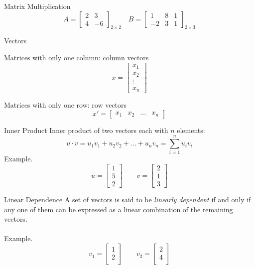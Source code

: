 \documentclass{./../../Latex/teaching_slides}
\begin{document}
\begin{frame}{Matrix Multiplication}
$$A = \begin{bmatrix}
2 & 3  \\
4 & -6 
\end{bmatrix}_{2 \times 2} \quad B = \begin{bmatrix}
1 & 8 & 1\\
-2 & 3 & 1
\end{bmatrix}_{2 \times 3}$$
\end{frame}


\begin{frame}{Vectors}
\begin{witemize}
\item Matrices with only one column: column vectors 
$$ x =  \begin{bmatrix}
x_1\\
x_2 \\
\vdots \\
x_n
\end{bmatrix} $$
\item Matrices with only one row: row vectors
$$ x' =  \begin{bmatrix}
x_1 &
x_2 & \hdots &
x_n
\end{bmatrix} $$
\end{witemize}
\end{frame}

\begin{frame}{Inner Product}
Inner product of two vectors each with $n$ elements:
$$ u \cdot v = u_1 v_1 + u_2 v_2 +...+ u_n v_n = \sum_{i=1}^n u_i v_i $$ 
Example. $$u = \begin{bmatrix} 1 \\ 5 \\ 2 \end{bmatrix} \quad \quad v = \begin{bmatrix} 2 \\ 1 \\ 3 \end{bmatrix}$$
\end{frame}

\begin{frame}{Linear Dependence}
A set of vectors is said to be \textit{linearly dependent} if and only if any one of them can be expressed as a linear combination of the remaining vectors. \\~\\
Example.$$ v_1 =  \begin{bmatrix}
1\\
2 \\
\end{bmatrix} \quad \quad v_2 = \begin{bmatrix}
2\\
4 \\
\end{bmatrix}$$
\end{frame}
\end{document}
